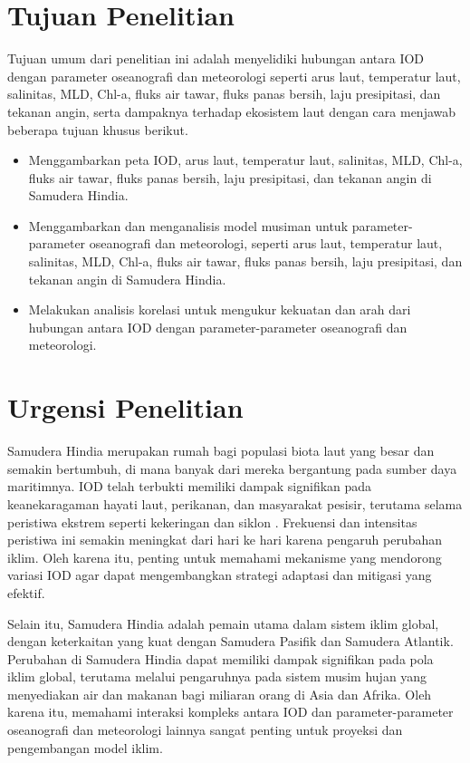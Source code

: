 \begin{spacing}{1.5}
	\section[Tujuan Penelitian]{Tujuan Penelitian}
	
	Tujuan umum dari penelitian ini adalah menyelidiki hubungan antara IOD dengan parameter oseanografi dan meteorologi seperti arus laut, temperatur laut, salinitas, MLD, Chl-a, fluks air tawar, fluks panas bersih, laju presipitasi, dan tekanan angin, serta dampaknya terhadap ekosistem laut dengan cara menjawab beberapa tujuan khusus berikut.
	
	\begin{itemize}
		\item Menggambarkan peta IOD, arus laut, temperatur laut, salinitas, MLD, Chl-a, fluks air tawar, fluks panas bersih, laju presipitasi, dan tekanan angin di Samudera Hindia.
		\item Menggambarkan dan menganalisis model musiman untuk parameter-parameter oseanografi dan meteorologi, seperti arus laut, temperatur laut, salinitas, MLD, Chl-a, fluks air tawar, fluks panas bersih, laju presipitasi, dan tekanan angin di Samudera Hindia.
		\item Melakukan analisis korelasi untuk mengukur kekuatan dan arah dari hubungan antara IOD dengan parameter-parameter oseanografi dan meteorologi.
	\end{itemize}
	\section[Urgensi Penelitian]{Urgensi Penelitian}

	Samudera Hindia merupakan rumah bagi populasi biota laut yang besar dan semakin bertumbuh, di mana banyak dari mereka bergantung pada sumber daya maritimnya. IOD telah terbukti memiliki dampak signifikan pada keanekaragaman hayati laut, perikanan, dan masyarakat pesisir, terutama selama peristiwa ekstrem seperti kekeringan \cite{Pan2018} dan siklon \cite{Wahiduzzaman2022}. Frekuensi dan intensitas peristiwa ini semakin meningkat dari hari ke hari karena pengaruh perubahan iklim. Oleh karena itu, penting untuk memahami mekanisme yang mendorong variasi IOD agar dapat mengembangkan strategi adaptasi dan mitigasi yang efektif.
	
	Selain itu, Samudera Hindia adalah pemain utama dalam sistem iklim global, dengan keterkaitan yang kuat dengan Samudera Pasifik dan Samudera Atlantik. Perubahan di Samudera Hindia dapat memiliki dampak signifikan pada pola iklim global, terutama melalui pengaruhnya pada sistem musim hujan yang menyediakan air dan makanan bagi miliaran orang di Asia dan Afrika. Oleh karena itu, memahami interaksi kompleks antara IOD dan parameter-parameter oseanografi dan meteorologi lainnya sangat penting untuk proyeksi dan pengembangan model iklim.
	

\end{spacing}
